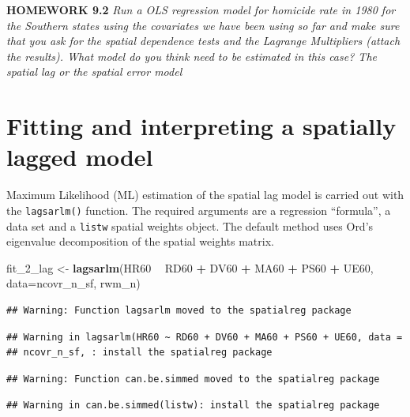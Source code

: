 \documentclass[]{book}
\newenvironment{Shaded}{\begin{snugshade}}{\end{snugshade}}
\newcommand{\DataTypeTok}[1]{\textcolor[rgb]{0.13,0.29,0.53}{#1}}
\newcommand{\DecValTok}[1]{\textcolor[rgb]{0.00,0.00,0.81}{#1}}
\newcommand{\KeywordTok}[1]{\textcolor[rgb]{0.13,0.29,0.53}{\textbf{#1}}}
\newcommand{\NormalTok}[1]{#1}
\newcommand{\OperatorTok}[1]{\textcolor[rgb]{0.81,0.36,0.00}{\textbf{#1}}}
\newcommand{\StringTok}[1]{\textcolor[rgb]{0.31,0.60,0.02}{#1}}
\begin{document}
\textbf{HOMEWORK 9.2}
\emph{Run a OLS regression model for homicide rate in 1980 for the Southern states using the covariates we have been using so far and make sure that you ask for the spatial dependence tests and the Lagrange Multipliers (attach the results). What model do you think need to be estimated in this case? The spatial lag or the spatial error model}

\hypertarget{fitting-and-interpreting-a-spatially-lagged-model}{%
\section{Fitting and interpreting a spatially lagged model}\label{fitting-and-interpreting-a-spatially-lagged-model}}

Maximum Likelihood (ML) estimation of the spatial lag model is carried out with the \texttt{lagsarlm()} function. The required arguments are a regression ``formula'', a data set and a \texttt{listw} spatial weights object. The default method uses Ord's eigenvalue decomposition of the spatial weights matrix.

\begin{Shaded}
\begin{Highlighting}[]
\NormalTok{fit_}\DecValTok{2}\NormalTok{_lag <-}\StringTok{ }\KeywordTok{lagsarlm}\NormalTok{(HR60 }\OperatorTok{~}\StringTok{ }\NormalTok{RD60 }\OperatorTok{+}\StringTok{ }\NormalTok{DV60 }\OperatorTok{+}\StringTok{ }\NormalTok{MA60 }\OperatorTok{+}\StringTok{ }\NormalTok{PS60 }\OperatorTok{+}\StringTok{ }\NormalTok{UE60, }\DataTypeTok{data=}\NormalTok{ncovr_n_sf, rwm_n)}
\end{Highlighting}
\end{Shaded}

\begin{verbatim}
## Warning: Function lagsarlm moved to the spatialreg package
\end{verbatim}

\begin{verbatim}
## Warning in lagsarlm(HR60 ~ RD60 + DV60 + MA60 + PS60 + UE60, data =
## ncovr_n_sf, : install the spatialreg package
\end{verbatim}

\begin{verbatim}
## Warning: Function can.be.simmed moved to the spatialreg package
\end{verbatim}

\begin{verbatim}
## Warning in can.be.simmed(listw): install the spatialreg package
\end{verbatim}
\end{document}
